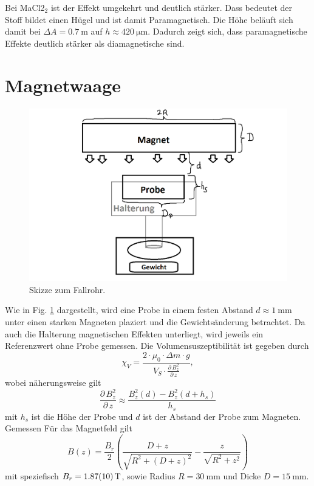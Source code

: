 \documentclass[11pt,a4paper,titlepage, ngerman]{article}
\newcommand{\reffig}[1]{Fig. \ref{fig:#1}}
\begin{document}
	Bei MaCl2$_2$ ist der Effekt umgekehrt und deutlich stärker.
	Dass bedeutet der Stoff bildet einen Hügel und ist damit Paramagnetisch.
	Die Höhe beläuft sich damit bei $\Delta A = \SI{0,7}{\meter}$ auf $h \approx \SI{420}{\micro\meter}$.
	Dadurch zeigt sich, dass paramagnetische Effekte deutlich stärker als diamagnetische sind.
	
	
	\section{Magnetwaage}
	\begin{figure}[ht]
		\includegraphics[width=\textwidth]{SkizzeMagnetwaage.png}
		\caption{Skizze zum Fallrohr.}
		\label{fig:magnetwaage}
	\end{figure}
	Wie in \reffig{magnetwaage} dargestellt, wird eine Probe in einem festen Abstand $d\approx\SI{1}{\milli\meter}$ unter einen starken Magneten plaziert und die Gewichtsänderung betrachtet.
	Da auch die Halterung magnetischen Effekten unterliegt, wird jeweils ein Referenzwert ohne Probe gemessen.
	Die Volumensuszeptibilität ist gegeben durch
	\begin{equation}
		\chi_V = \frac{2 \cdot \mu_0 \cdot \Delta m \cdot g}{V_S \cdot \frac{\partial\,B^2_z}{\partial\,z}},
	\end{equation}
	wobei näherungsweise gilt
	\begin{equation}
		\frac{\partial\,B^2_z}{\partial\,z} \approx \frac{B_z^2(d) - B_z^2(d+h_s)}{h_s}
	\end{equation}
	mit $h_s$ ist die Höhe der Probe und $d$ ist der Abstand der Probe zum Magneten.
	Gemessen 
	Für das Magnetfeld gilt
	\begin{equation}
		B(z) = \frac{B_r}{2}\left( \frac{D+z}{\sqrt{R^2 + (D+z)^2}} - \frac{z}{\sqrt{R^2 + z^2}}\right)
	\end{equation}
	mit speziefisch $B_r = \SI{1,87+-0,1}{T}$, sowie Radius $R = \SI{30}{\milli\meter}$ und Dicke $D = \SI{15}{\milli\meter}$.
	
\end{document}
